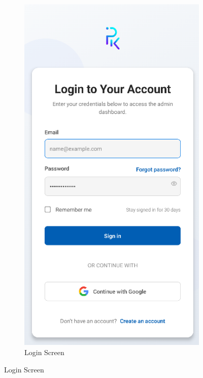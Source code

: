 \begin{figure}[htbp]
    \centering
    \begin{subfigure}[b]{0.25\textwidth}
        \centering
        \includegraphics[width=\textwidth]{images/mobile-auth-screen_login.png}
        \caption{Login Screen}

\end{subfigure}
\end{figure}

